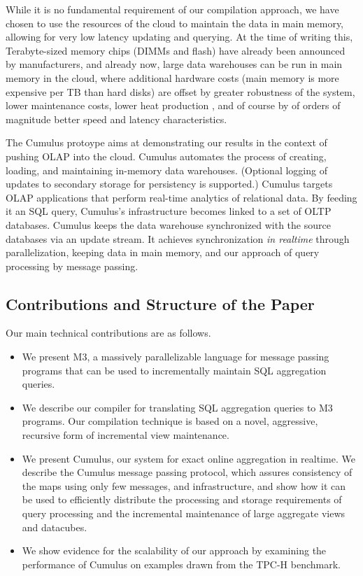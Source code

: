 While it is no fundamental requirement of our compilation
approach, we have chosen to use the resources of the cloud to maintain
the data in main memory, allowing for very low latency updating and querying.
At the time of writing this,
Terabyte-sized memory chips (DIMMs and flash) have already been announced by
manufacturers, and already now, large data warehouses
can be run in main memory in the cloud, where additional hardware costs
(main memory is more expensive per TB than hard disks) are
offset by greater robustness of the system, lower maintenance
costs, lower heat production \cite{1154557}, and of course by of orders
of magnitude better speed and latency characteristics.

The Cumulus protoype aims at demonstrating our results in the context of
pushing OLAP into the cloud.
Cumulus automates  the process of  creating, loading,
and  maintaining  in-memory  data  warehouses.
(Optional logging of updates to secondary storage
for persistency is supported.)
Cumulus targets OLAP applications  that perform real-time analytics of
relational data.  By feeding it an SQL query, Cumulus's infrastructure
becomes linked to  a set of OLTP databases.  Cumulus  keeps the
data warehouse synchronized with the source databases via an
update stream. It achieves synchronization {\em in realtime}
through parallelization, keeping data in main memory, and our approach of
query processing by message passing.


\subsection{Contributions and Structure of the Paper}


Our main technical contributions are as follows.
\begin{itemize}
\item
We present M3, a massively parallelizable language
for message passing programs that can be used to incrementally maintain
SQL aggregation queries.

\item
We describe our compiler for translating SQL aggregation queries to M3
programs. Our compilation technique is based on a novel, aggressive, recursive
form of incremental view maintenance.

\item
We present Cumulus, our system for exact online aggregation in realtime.
We describe the Cumulus message passing protocol, which assures
consistency of the maps using only few messages, and
infrastructure, and show how it can be used to efficiently distribute the
processing and storage requirements of query processing and
the incremental maintenance of large aggregate views and datacubes.

\item We show evidence for the scalability of our approach by examining the
performance of Cumulus on examples drawn from the TPC-H\cite{tpch2008}
benchmark. 
\end{itemize}


